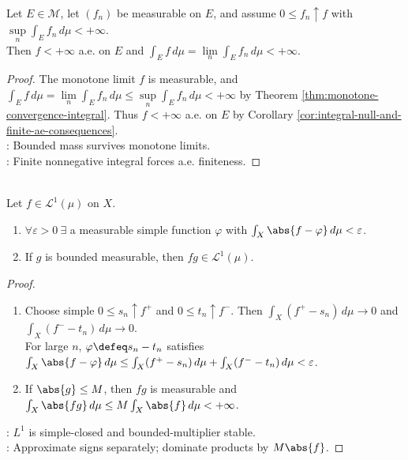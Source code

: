 \begin{corollary} \label{cor:beppo-levi-bounded-integral-criterion} \\
Let $E\in\mathcal{M}$, let $(f_n)$ be measurable on $E$, and assume $0\leq f_n\uparrow f$ with $\sup\limits_n\int_Ef_n\,d\mu<+\infty$.\\
Then $f<+\infty$ a.e. on $E$ and $\int_Ef\,d\mu=\lim\limits_n\int_Ef_n\,d\mu<+\infty$.
\begin{proof}
The monotone limit $f$ is measurable, and
$\int_Ef\,d\mu=\lim\limits_n\int_Ef_n\,d\mu\leq\sup\limits_n\int_Ef_n\,d\mu<+\infty$ by Theorem \ref{thm:monotone-convergence-integral}. Thus $f<+\infty$ a.e. on $E$ by Corollary \ref{cor:integral-null-and-finite-ae-consequences}.\\
: Bounded mass survives monotone limits.\\
: Finite nonnegative integral forces a.e. finiteness.
\end{proof}
\end{corollary}

\begin{proposition} \label{prop:l1-simple-approximation-and-bounded-multipliers} \\
Let $f\in\mathscr{L}^1(\mu)$ on $X$.
\begin{enumerate}[label=(\roman*)]
\setlength{\itemsep}{0pt}
\item $\forall\varepsilon>0\ \exists$ a measurable simple function $\varphi$ with $\int_X\abs{f-\varphi}\,d\mu<\varepsilon$.
\item If $g$ is bounded measurable, then $fg\in\mathscr{L}^1(\mu)$.
\end{enumerate}
\begin{proof}
\begin{enumerate}[label=(\roman*)]
\setlength{\itemsep}{0pt}
\item Choose simple $0\leq s_n\uparrow f^+$ and $0\leq t_n\uparrow f^-$. Then $\int_X(f^+-s_n)\,d\mu\to0$ and $\int_X(f^--t_n)\,d\mu\to0$.\\
For large $n$, $\varphi\defeq s_n-t_n$ satisfies $\int_X\abs{f-\varphi}\,d\mu\leq\int_X(f^+-s_n)\,d\mu+\int_X(f^--t_n)\,d\mu<\varepsilon$.
\item If $\abs{g}\leq M$, then $fg$ is measurable and $\int_X\abs{fg}\,d\mu\leq M\int_X\abs{f}\,d\mu<+\infty$.
\end{enumerate}
: $L^1$ is simple-closed and bounded-multiplier stable.\\
: Approximate signs separately; dominate products by $M\abs{f}$.
\end{proof}
\end{proposition}

